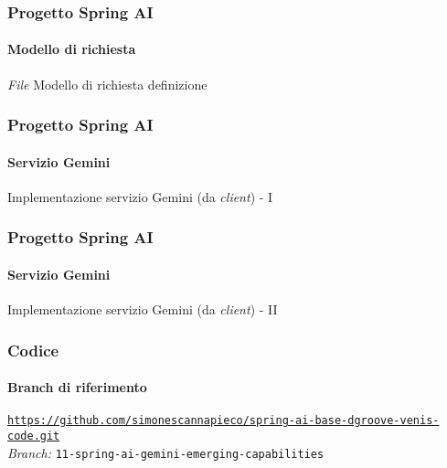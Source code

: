 %
\begin{frame}[t,fragile] \frametitle{Progetto Spring AI}
    \framesubtitle{Modello di richiesta}
        \begin{block}{\textit{File} Modello di richiesta definizione}
			{\scriptsize}
    	\end{block}
\end{frame}
%
\begin{frame}[t,fragile] \frametitle{Progetto Spring AI}
    \framesubtitle{Servizio Gemini}
		\vspace*{-.7cm}
        \begin{block}{Implementazione servizio Gemini (da \textit{client}) - I}
{\tiny}
    \end{block}
\end{frame}
%
\begin{frame}[t,fragile] \frametitle{Progetto Spring AI}
    \framesubtitle{Servizio Gemini}
    	\vspace*{-.7cm}
        \begin{block}{Implementazione servizio Gemini (da \textit{client}) - II}
{\tiny}
    \end{block}
\end{frame}
%
\begin{frame}[fragile] \frametitle{Codice}
    \framesubtitle{Branch di riferimento}
	\begin{center}
		{\scriptsize \href{https://github.com/simonescannapieco/spring-ai-base-dgroove-venis-code.git}{\texttt{https://github.com/simonescannapieco/spring-ai-base-dgroove-venis-code.git}}}\\
		\textit{Branch:} \alert{\texttt{11-spring-ai-gemini-emerging-capabilities}}
	\end{center}
\end{frame}
